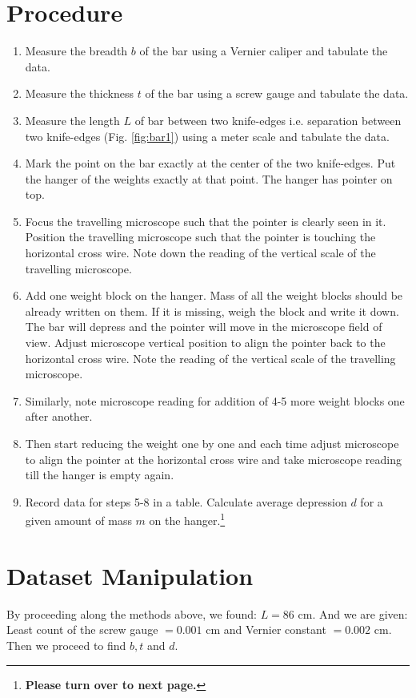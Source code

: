 \documentclass[11pt]{scrartcl}
\begin{document}
\section{Procedure}
\begin{enumerate}
    \item Measure the breadth \(b\) of the bar using a Vernier caliper and tabulate the data.
    \item Measure the thickness \(t\) of the bar using a screw gauge and tabulate the data.
    \item Measure the length \(L\) of bar between two knife-edges i.e. separation between two knife-edges (Fig. \ref{fig:bar1}) using a meter scale and tabulate the data.
    \item Mark the point on the bar exactly at the center of the two knife-edges. Put the hanger of the weights exactly at that point. The hanger has pointer on top.
    \item Focus the travelling microscope such that the pointer is clearly seen in it. Position the travelling microscope such that the pointer is touching the horizontal cross wire. Note down the reading of the vertical scale of the travelling microscope.
    \item Add one weight block on the hanger. Mass of all the weight blocks should be already written on them. If it is missing, weigh the block and write it down. The bar will depress and the pointer will move in the microscope field of view. Adjust microscope vertical position to align the pointer back to the horizontal cross wire. Note the reading of the vertical scale of the travelling microscope. 
    \item Similarly, note microscope reading for addition of 4-5 more weight blocks one after another.
    \item Then start reducing the weight one by one and each time adjust microscope to align the pointer at the horizontal cross wire and take microscope reading till the hanger is empty again. 
    \item Record data for steps 5-8 in a table. Calculate average depression \(d\) for a given amount of mass \(m\) on the hanger.\footnote{\textbf{Please turn over to next page.}}
\end{enumerate}

\newpage

\section{Dataset Manipulation}
By proceeding along the methods above, we found: \(L = 86\) cm. And we are given: Least count of the screw gauge \(= 0.001\) cm and Vernier constant \(=0.002\) cm. Then we proceed to find \(b, t\) and \(d\).
\end{document}
